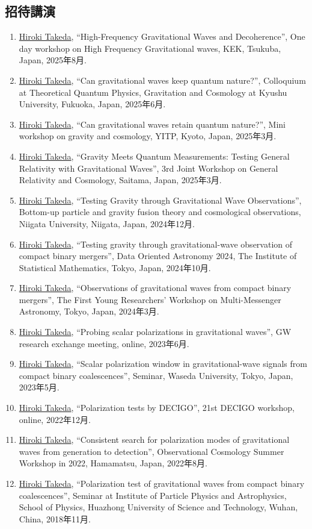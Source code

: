 \documentclass[uplatex, 11pt]{jsarticle}
\begin{document}
\subsection*{招待講演}
\begin{enumerate}
\item \uline{Hiroki Takeda}, “High-Frequency Gravitational Waves and Decoherence”, One day workshop on High Frequency Gravitational waves, KEK, Tsukuba, Japan, 2025年8月.
\item \uline{Hiroki Takeda}, “Can gravitational waves keep quantum nature?”, Colloquium at Theoretical Quantum Physics, Gravitation and Cosmology at Kyushu University, Fukuoka, Japan, 2025年6月.
\item \uline{Hiroki Takeda}, “Can gravitational waves retain quantum nature?”, Mini workshop on gravity and cosmology, YITP, Kyoto, Japan, 2025年3月.
\item \uline{Hiroki Takeda}, “Gravity Meets Quantum Measurements: Testing General Relativity with Gravitational Waves”, 3rd Joint Workshop on General Relativity and Cosmology, Saitama, Japan, 2025年3月.
\item \uline{Hiroki Takeda}, “Testing Gravity through Gravitational Wave Observations”, Bottom-up particle and gravity fusion theory and cosmological observations, Niigata University, Niigata, Japan, 2024年12月.
\item \uline{Hiroki Takeda}, “Testing gravity through gravitational-wave observation of compact binary mergers”, Data Oriented Astronomy 2024, The Institute of Statistical Mathematics, Tokyo, Japan, 2024年10月.
\item \uline{Hiroki Takeda}, “Observations of gravitational waves from compact binary mergers”, The First Young Researchers' Workshop on Multi-Messenger Astronomy, Tokyo, Japan, 2024年3月.
\item \uline{Hiroki Takeda}, “Probing scalar polarizations in gravitational waves”, GW research exchange meeting, online, 2023年6月.
\item \uline{Hiroki Takeda}, “Scalar polarization window in gravitational-wave signals from compact binary coalescences”, Seminar, Waseda University, Tokyo, Japan, 2023年5月.
\item \uline{Hiroki Takeda}, “Polarization tests by DECIGO”, 21st DECIGO workshop, online, 2022年12月.
\item \uline{Hiroki Takeda}, “Consistent search for polarization modes of gravitational waves from generation to detection”, Observational Cosmology Summer Workshop in 2022, Hamamatsu, Japan, 2022年8月.
\item \uline{Hiroki Takeda}, “Polarization test of gravitational waves from compact binary coalescences”, Seminar at Institute of Particle Physics and Astrophysics, School of Physics, Huazhong University of Science and Technology, Wuhan, China, 2018年11月.
\end{enumerate}
\end{document}
